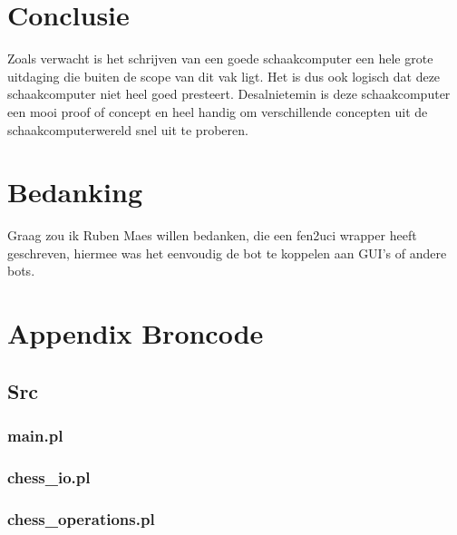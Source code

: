 \documentclass[a4paper,10pt]{article}
\begin{document}
\section{Conclusie}%
Zoals verwacht is het schrijven van een goede schaakcomputer een hele grote uitdaging die buiten de scope van dit vak ligt.
Het is dus ook logisch dat deze schaakcomputer niet heel goed presteert.
Desalnietemin is deze schaakcomputer een mooi proof of concept en heel handig om verschillende concepten uit de schaakcomputerwereld snel uit te proberen.



\section{Bedanking}
Graag zou ik Ruben Maes willen bedanken, die een fen2uci wrapper heeft geschreven, hiermee was het eenvoudig de bot te koppelen aan GUI's of andere bots. 
\printbibliography


\section{Appendix Broncode}
  \subsection{Src}
    \subsubsection{main.pl}\label{main}
      
    \subsubsection{chess\_io.pl}\label{chess_io}
      
    \subsubsection{chess\_operations.pl}\label{chess_operations}
      
\end{document}

